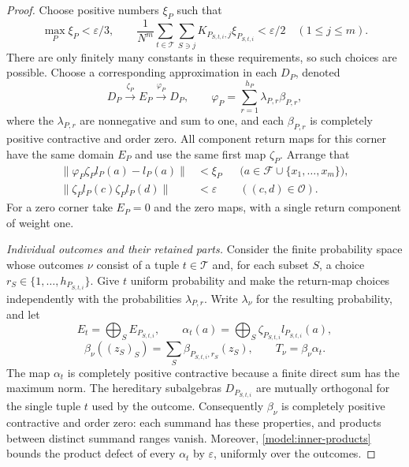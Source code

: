 \begin{proof}
Choose positive numbers $\xi_P$ such that
\begin{equation}
 \label{model:inner-tolerances}
 \max_P\xi_P<\varepsilon/3,
 \qquad
 \frac1{N^m}\sum_{t\in\mathcal T}\sum_{S\ni j}
       K_{P_{S,t,i},j}\xi_{P_{S,t,i}}<\varepsilon/2
       \quad(1\leq j\leq m).
\end{equation}
There are only finitely many constants in these requirements, so
such choices are possible.  Choose a corresponding approximation
in each $D_P$, denoted
\[
 D_P\xrightarrow{\zeta_P}E_P
   \xrightarrow{\varphi_P}D_P,
 \qquad
 \varphi_P=\sum_{r=1}^{h_P}\lambda_{P,r}\beta_{P,r},
\]
where the $\lambda_{P,r}$ are nonnegative and sum to one, and each
$\beta_{P,r}$ is completely positive contractive and order zero.
All component return maps for this corner have the same domain
$E_P$ and use the same first map $\zeta_P$.  Arrange that
\begin{align}
 \|\varphi_P\zeta_Pl_P(a)-l_P(a)\|&<\xi_P
       &&\bigl(a\in\mathcal F\cup\{x_1,\ldots,x_m\}\bigr),
       \label{model:inner-approx}\\
 \|\zeta_Pl_P(c)\zeta_Pl_P(d)\|&<\varepsilon
       &&((c,d)\in\mathcal O).
       \label{model:inner-products}
\end{align}
For a zero corner take $E_P=0$ and the zero maps, with a single
return component of weight one.

\emph{Individual outcomes and their retained parts.}
Consider the finite probability space whose outcomes $\nu$
consist of a tuple $t\in\mathcal T$ and, for each subset $S$, a
choice $r_S\in\{1,\ldots,h_{P_{S,t,i}}\}$.  Give $t$ uniform
probability and make the return-map choices independently with
the probabilities $\lambda_{P,r}$.  Write $\lambda_\nu$ for
the resulting probability, and let
\[
 E_t=\bigoplus_S E_{P_{S,t,i}},\qquad
 \alpha_t(a)=\bigoplus_S\zeta_{P_{S,t,i}}l_{P_{S,t,i}}(a),
\]
\[
 \beta_\nu((z_S)_S)=
   \sum_S\beta_{P_{S,t,i},r_S}(z_S),
 \qquad T_\nu=\beta_\nu\alpha_t.
\]
The map $\alpha_t$ is completely positive contractive because a
finite direct sum has the maximum norm.  The hereditary
subalgebras $D_{P_{S,t,i}}$ are mutually orthogonal for the single
tuple $t$ used by the outcome.
Consequently $\beta_\nu$ is completely positive contractive
and order zero: each summand has these properties, and products
between distinct summand ranges vanish.  Moreover,
\eqref{model:inner-products} bounds the product defect of every
$\alpha_t$ by $\varepsilon$, uniformly over the outcomes.


\end{proof}
